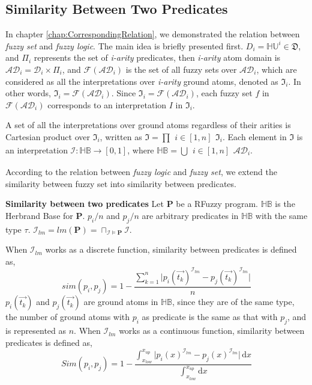 \subsection{Similarity Between Two Predicates}
\label{sec:predicateSim}
In chapter \ref{chap:CorrespondingRelation}, we demonstrated the relation between \textit{fuzzy set} and \textit{fuzzy logic}. The main idea is briefly presented first. $D_i = \mathbb{HU}^{i} \in \mathfrak{D}$, and $\Pi_i$ represents the set of \textit{i-arity} predicates, then \textit{i-arity} atom domain is $\mathcal{AD}_i = \mathcal{D}_i \times \Pi_i$, and $\mathcal{F}(\mathcal{AD}_i)$ is the set of all fuzzy sets over $\mathcal{AD}_i$, which are considered as all the interpretations over \textit{i-arity} ground atoms, denoted as $\mathfrak{I}_i$.
In other words, $\mathfrak{I}_i=\mathcal{F}(\mathcal{AD}_i)$. Since $\mathfrak{I}_i=\mathcal{F}(\mathcal{AD}_i)$, each fuzzy set $f$ in $\mathcal{F}(\mathcal{AD}_i)$ corresponds to an interpretation $I$ in $\mathfrak{I}_i$. 

A set of all the interpretations over ground atoms regardless of their arities is Cartesian product over $\mathfrak{I}_i$, written as $\mathfrak{I}=\prod{\substack{i \in [1,n]}}\mathfrak{I}_i$. Each element in $\mathfrak{I}$ is an interpretation $\mathcal{I} : \mathbb{HB} \rightarrow [0,1]$, where $\mathbb{HB}=\bigcup{\substack{i \in [1,n]}}\mathcal{AD}_i$. 

According to the relation between \textit{fuzzy logic} and \textit{fuzzy set}, we extend the similarity between fuzzy set into similarity between predicates.

\begin{defin}\textbf{Similarity between two predicates}
Let \textbf{P} be a RFuzzy program. $\mathbb{HB}$ is the Herbrand Base for \textbf{P}. $p_i/n$ and $p_j/n$ are arbitrary predicates in $\mathbb{HB}$ with the same type $\tau$. $\mathcal{I}_{lm}=lm(\textbf{P})=\sqcap_{\mathcal{I}\models\textbf{P}}\mathcal{I}$. 

When $\mathcal{I}_{lm}$ works as a discrete function, similarity between predicates is defined as,
\begin{equation}
sim(p_i,p_j)=1-\frac{\sum_{k=1}^{n} \rvert p_i(\vec{t_k})^{\mathcal{I}_{lm}}-p_j(\vec{t_k})^{\mathcal{I}_{lm}} \lvert}{n}
\end{equation}
$p_i(\vec{t_k})$ and $p_j(\vec{t_k})$ are ground atoms in $\mathbb{HB}$, since they are of the same type, the number of ground atoms with $p_i$ as predicate is the same as that with $p_j$, and is represented as $n$.
When $\mathcal{I}_{lm}$ works as a continuous function, similarity between predicates is defined as,
\begin{equation}
Sim(p_i,p_j) =1- \frac{\int_{x_{low}}^{x_{up}} \rvert p_i(x)^{\mathcal{I}_{lm}}-p_j(x)^{\mathcal{I}_{lm}} \lvert\, \mathrm{d}x}{\int_{x_{low}}^{x_{up}}\mathrm{d}x}
\end{equation}

\end{defin} 

